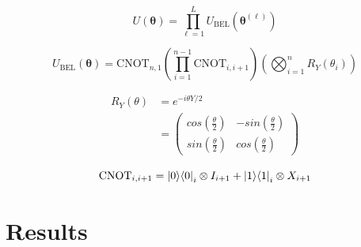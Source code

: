 \documentclass[runningheads]{llncs}
\begin{document}
\begin{equation}
U(\boldsymbol{\theta}) = \prod_{\ell=1}^{L} U_{\mathrm{BEL}}(\boldsymbol{\theta}^{(\ell)})
\end{equation}

\begin{equation}
U_{\mathrm{BEL}}(\boldsymbol{\theta})
=
\mathrm{CNOT}_{n,1}
\left(
\prod_{i=1}^{n-1} \mathrm{CNOT}_{i,i+1}
\right)
\left(
\bigotimes_{i=1}^{n} R_Y(\theta_i)
\right)
\end{equation}

\begin{align*}
R_Y(\theta) &= e^{-i \theta Y / 2}\\
&= \begin{pmatrix}
cos(\frac{\theta}{2}) & -sin(\frac{\theta}{2})  \\
sin(\frac{\theta}{2})  & cos(\frac{\theta}{2}) 
\end{pmatrix}
\end{align*}

\begin{equation}
\mathrm{CNOT}_{i,i+1}
=
\ket{0}\!\bra{0}_i \otimes I_{i+1}
+
\ket{1}\!\bra{1}_i \otimes X_{i+1}
\end{equation}



\section{Results}
\end{document}
